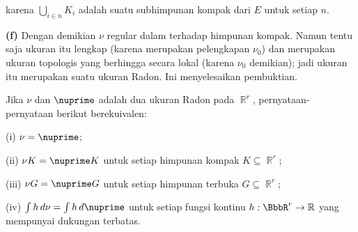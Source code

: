 {

\noindent karena $\bigcup_{i\in n}K_i$ adalah suatu subhimpunan kompak dari $E$ untuk
setiap $n$.

\medskip

{\bf (f)} Dengan demikian $\nu$ regular dalam terhadap himpunan kompak.
Namun tentu saja ukuran itu lengkap (karena merupakan pelengkapan $\nu_0$) dan merupakan ukuran topologis
yang berhingga secara
lokal (karena $\nu_0$ demikian);  jadi ukuran itu merupakan suatu ukuran Radon.
Ini menyelesaikan pembuktian.
}%

 Jika $\nu$ dan $\nuprime$ adalah dua ukuran Radon
pada $\BbbR^r$, pernyataan-pernyataan berikut berekuivalen:

(i) $\nu=\nuprime$;

(ii) $\nu K=\nuprime K$ untuk setiap himpunan kompak $K\subseteq\BbbR^r$;

(iii) $\nu G=\nuprime G$ untuk setiap himpunan terbuka $G\subseteq\BbbR^r$;

(iv) $\int h\,d\nu=\int h\,d\nuprime$ untuk setiap fungsi kontinu
$h:\BbbR^r\to\Bbb R$ yang mempunyai dukungan terbatas.

